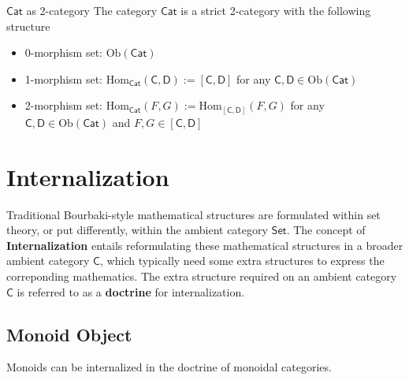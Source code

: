 \begin{example}{$\mathsf{Cat}$ as 2-category}{}
    The category $\mathsf{Cat}$ is a strict 2-category with the following structure
    \begin{itemize}
        \item 0-morphism set: $\mathrm{Ob}(\mathsf{Cat})$
        \item 1-morphism set: $\mathrm{Hom}_{\mathsf{Cat}}(\mathsf{C},\mathsf{D}):=[\mathsf{C},\mathsf{D}]$ for any $\mathsf{C},\mathsf{D}\in \mathrm{Ob}(\mathsf{Cat})$
        \item 2-morphism set: $\mathrm{Hom}_{\mathsf{Cat}}(F,G):=\mathrm{Hom}_{[\mathsf{C},\mathsf{D}]}\left(F,G\right)$ for any $\mathsf{C},\mathsf{D}\in \mathrm{Ob}(\mathsf{Cat})$ and $F,G\in [\mathsf{C},\mathsf{D}]$
    \end{itemize}
\end{example}

\section{Internalization}
Traditional Bourbaki-style mathematical structures are formulated within set theory, or put differently, within the ambient category $\mathsf{Set}$. The concept of \textbf{Internalization} entails reformulating these mathematical structures in a broader ambient category $\mathsf{C}$, which typically need some extra structures to express the correponding mathematics. The extra structure required on an ambient category $\mathsf{C}$ is referred to as a \textbf{doctrine} for internalization.

\subsection{Monoid Object}
Monoids can be internalized in the doctrine of monoidal categories.

